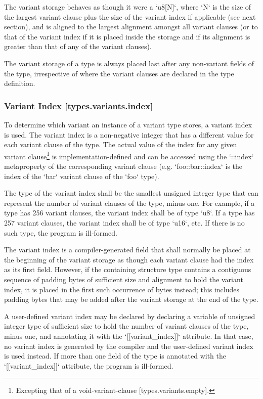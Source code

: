 \documentclass[a4paper, 12pt, oneside, final]{article}
\begin{document}
The variant storage behaves as though it were a `u8[N]`, where `N` is the size of the largest variant clause plus
the size of the variant index if applicable (see next section), and is aligned to the largest alignment amongst all variant
clauses (or to that of the variant index if it is placed inside the storage and if its alignment is greater than that of any
of the variant clauses).

The variant storage of a type is always placed last after any non-variant fields of the type, irrespective of where the variant
clauses are declared in the type definition.

\subsubsection{Variant Index [types.variants.index]}
To determine which variant an instance of a variant type stores, a variant index is used. The variant index is a
non-negative integer that has a different value for each variant clause of the type. The actual value of the index
for any given variant clause\footnote{Excepting that of a void-variant-clause [types.variants.empty].} is
implementation-defined and can be accessed using the `::index` metaproperty
of the corresponding variant clause (e.g. `foo::bar::index` is the index of the `bar`
variant clause of the `foo` type).

The type of the variant index shall be the smallest unsigned integer type that can represent the number of variant clauses
of the type, minus one. For example, if a type has 256 variant clauses, the variant index shall be of type `u8`.
If a type has 257 variant clauses, the variant index shall be of type `u16`, etc. If there is no such type, the
program is ill-formed.

The variant index is a compiler-generated field that shall normally be placed at the beginning of the variant storage as though
each variant clause had the index as its first field. However, if the containing structure type contains a contiguous
sequence of padding bytes of sufficient size and alignment to hold the variant index, it is placed in the first such
occurrence of bytes instead; this includes padding bytes that may be added after the variant storage at the end of the type.

A user-defined variant index may be declared by declaring a variable of unsigned integer type of sufficient size to hold
the number of variant clauses of the type, minus one, and annotating it with the `[[variant\_index]]` attribute. In that case,
no variant index is generated by the compiler and the user-defined variant index is used instead. If more than one field
of the type is annotated with the `[[variant\_index]]` attribute, the program is ill-formed.
\end{document}
